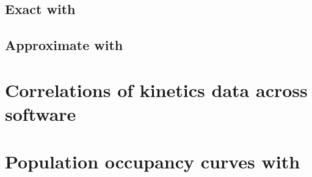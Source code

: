\subsection{Exact \mfpt with \rnamfpt}
\label{subsec:hermes:rnamfpt}

\subsection{Approximate \mfpt with \fftmfpt}
\label{subsec:hermes:fftmfpt}

\section{Correlations of kinetics data across software}
\label{sec:hermes:corr}

\section{Population occupancy curves with \ffteq}
\label{sec:hermes:popcurve}
